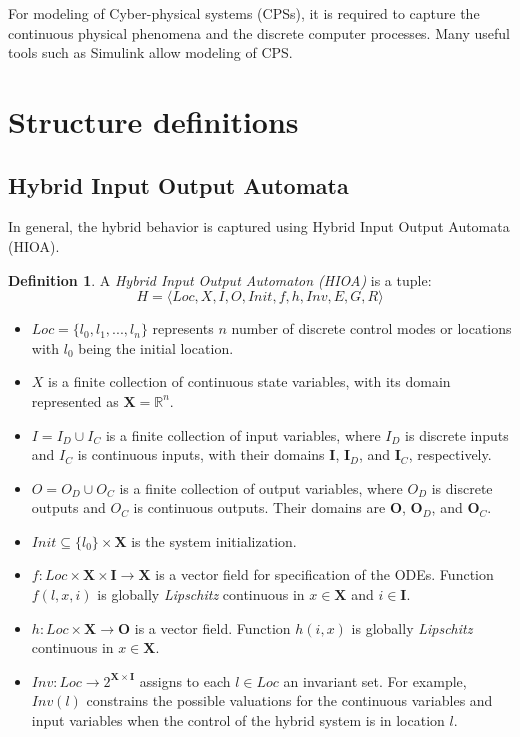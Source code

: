\documentclass[twoside,a4paper,12pt]{article}
\theoremstyle{definition}
\newtheorem{definition}{Definition}
\begin{document}
For modeling of Cyber-physical systems (CPSs), it is required to capture the continuous physical phenomena and the discrete computer processes. Many useful tools such as Simulink allow modeling of CPS.

\section{Structure definitions}
\subsection{Hybrid Input Output Automata}
In general, the hybrid behavior is captured using Hybrid Input Output Automata (HIOA).
\begin{definition}
	A \emph{Hybrid Input Output Automaton (HIOA)} is a tuple:
	\begin{equation}
	H = \langle Loc, X, I, O, Init, f, h, Inv, E, G, R \rangle
	\end{equation}
	\begin{itemize}
		\item $Loc = \{ l_0, l_1, ... , l_n\}$ represents $n$ number of discrete
		control modes or locations with $l_0$ being the initial location.
		\item $X$ is a finite collection of continuous state variables, with its domain represented as $\mathbf{X} = \mathbb{R}^n$.
		\item $I = I_D \cup I_C$ is a finite collection of input variables, where $I_D$ is discrete inputs and $I_C$ is continuous inputs, with their domains $\mathbf{I}$, $\mathbf{I}_D$, and $\mathbf{I}_C$, respectively.
		\item $O = O_D \cup O_C$ is a finite collection of output variables, where
		$O_D$ is discrete outputs and $O_C$ is continuous outputs. Their domains are $\mathbf{O}$, $\mathbf{O}_D$, and $\mathbf{O}_C$.
		\item $Init \subseteq \{l_0\} \times \mathbf{X}$ is the system initialization.
		\item $f:Loc \times \mathbf{X} \times \mathbf{I} \rightarrow \mathbf{X}$ is a vector field for specification of the ODEs. Function $f(l,x,i)$ is globally \emph{Lipschitz} continuous in $x \in \mathbf{X}$ and $i \in \mathbf{I}$.
		\item $h : Loc \times \mathbf{X} \rightarrow \mathbf{O}$ is a vector field. Function $h(i,x)$ is globally \emph{Lipschitz} continuous in $ x\in \mathbf{X}$.
		\item $Inv : Loc \rightarrow 2^{ \mathbf{X} \times \mathbf{I} }$ assigns to each $l \in Loc$ an invariant set. For example, $Inv(l)$ constrains the possible valuations for the continuous variables and input variables when the control of the hybrid system is in location $l$.

\end{itemize}
\end{definition}
\end{document}
